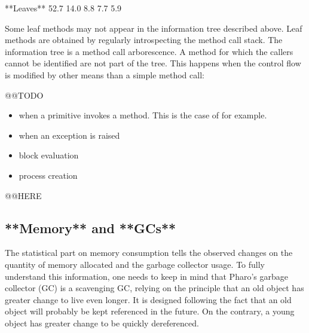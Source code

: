 \documentclass[a4paper,10pt,twoside]{book}
\begin{document}
\begin{code}
**Leaves**
52.7%
14.0%
8.8%
7.7%
5.9%
\end{code}

Some leaf methods may not appear in the information tree described above. Leaf methods are obtained by regularly introspecting the method call stack. The information tree is a method call arborescence. A method for which the callers cannot be identified are not part of the tree. This happens when the control flow is modified by other means than a simple method call: 

@@TODO
\begin{itemize}
\item when a primitive invokes a method. This is the case of  for example. 
\item when an exception is raised
\item block evaluation
\item process creation
\end{itemize}

@@HERE



 \subsection{**Memory** and **GCs**}

The statistical part on memory consumption tells the observed changes on the quantity of memory allocated and the garbage collector usage. To fully understand this information, one needs to keep in mind that Pharo's garbage collector (GC) is a scavenging GC, relying on the principle that an old object has greater change to live even longer. It is designed following the fact that an old object will probably be kept referenced in the future. On the contrary, a young object has greater change to be quickly dereferenced. 
\end{document}
